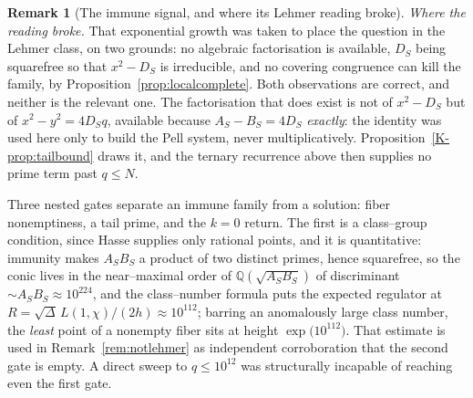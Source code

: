\documentclass[11pt]{article}
\theoremstyle{definition}
\newtheorem{remark}[theorem]{Remark}
\begin{document}
\begin{remark}[The immune signal, and where its Lehmer reading broke]
\emph{Where the reading broke.} That exponential growth was taken to place the question in the
Lehmer class, on two grounds: no algebraic factorisation is available, $D_S$ being squarefree so
that $x^2-D_S$ is irreducible, and no covering congruence can kill the family, by
Proposition~\ref{prop:localcomplete}. Both observations are correct, and neither is the relevant
one. The factorisation that does exist is not of $x^2-D_S$ but of $x^2-y^2=4D_Sq$, available because
$A_S-B_S=4D_S$ \emph{exactly}: the identity was used here only to build the Pell system, never
multiplicatively. Proposition~\ref{K-prop:tailbound} draws it, and the ternary recurrence above then
supplies no prime term past $q\le N$.

Three nested gates separate an immune family from a solution: fiber nonemptiness, a tail prime, and
the $k=0$ return. The first is a class--group condition, since Hasse supplies only rational points,
and it is quantitative: immunity makes $A_SB_S$ a product of two distinct primes, hence squarefree,
so the conic lives in the near--maximal order of $\mathbb{Q}(\sqrt{A_SB_S})$ of discriminant
${\sim}A_SB_S\approx10^{224}$, and the class--number formula puts the expected regulator at
$R=\sqrt\Delta\,L(1,\chi)/(2h)\approx10^{112}$; barring an anomalously large class number, the
\emph{least} point of a nonempty fiber sits at height $\exp\bigl(10^{112}\bigr)$. That estimate is
used in Remark~\ref{rem:notlehmer} as independent corroboration that the second gate is empty. A
direct sweep to $q\le10^{12}$ was structurally incapable of reaching even the first gate.
\end{remark}
\end{document}
